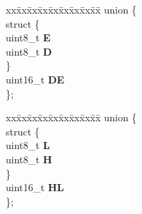 \begin{DoxyCompactItemize}
\begin{tabbing}
\end{tabbing}\item 
\mbox{\label{structcpu__t_a981097fb8aab0b7d9c0750c7a1d32532}} 
\begin{tabbing}
xx\=xx\=xx\=xx\=xx\=xx\=xx\=xx\=xx\=\kill
union \{\\
\mbox{\label{unioncpu__t_1_1_0D4_ad83ecee4938828938c384c1d5499ce62}} 
\>struct \{\\
\>\>uint8\_t {\bfseries E}\\
\>\>uint8\_t {\bfseries D}\\
\>\} \\
\>uint16\_t {\bfseries DE}\\
\}; \\

\end{tabbing}\item 
\mbox{\label{structcpu__t_a5d191cdfa3009d7422eb747e29779232}} 
\begin{tabbing}
xx\=xx\=xx\=xx\=xx\=xx\=xx\=xx\=xx\=\kill
union \{\\
\mbox{\label{unioncpu__t_1_1_0D6_a8cfeac7e2db049253694932c8b14abd0}} 
\>struct \{\\
\>\>uint8\_t {\bfseries L}\\
\>\>uint8\_t {\bfseries H}\\
\>\} \\
\>uint16\_t {\bfseries HL}\\
\}; \\


\end{tabbing}
\end{DoxyCompactItemize}
